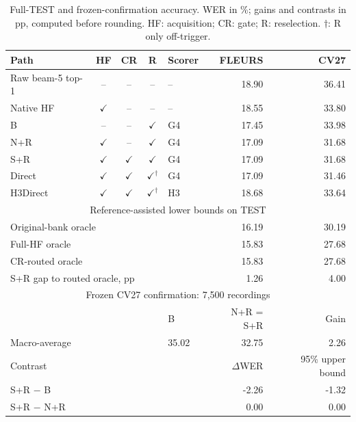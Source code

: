 \begin{table}[t]\centering\footnotesize
\caption{Full-TEST and frozen-confirmation accuracy. WER in \%; gains and contrasts in pp, computed before rounding. HF: acquisition; CR: gate; R: reselection. $\dagger$: R only off-trigger.}\label{tab:paths}
\setlength{\tabcolsep}{3pt}\renewcommand{\arraystretch}{1.03}
\begin{tabular}{@{}lccclrr@{}}\toprule
Path & HF & CR & R & Scorer & FLEURS & CV27\\\midrule
Raw beam-5 top-1 & -- & -- & -- & -- & 18.90 & 36.41\\
Native HF & $\checkmark$ & -- & -- & -- & 18.55 & 33.80\\
B & -- & -- & $\checkmark$ & G4 & 17.45 & 33.98\\
N+R & $\checkmark$ & -- & $\checkmark$ & G4 & 17.09 & 31.68\\
S+R & $\checkmark$ & $\checkmark$ & $\checkmark$ & G4 & 17.09 & 31.68\\
Direct & $\checkmark$ & $\checkmark$ & $\checkmark^{\dagger}$ & G4 & 17.09 & 31.46\\
H3Direct & $\checkmark$ & $\checkmark$ & $\checkmark^{\dagger}$ & H3 & 18.68 & 33.64\\
\midrule\multicolumn{7}{c}{Reference-assisted lower bounds on TEST}\\
\multicolumn{5}{l}{Original-bank oracle} & 16.19 & 30.19\\
\multicolumn{5}{l}{Full-HF oracle} & 15.83 & 27.68\\
\multicolumn{5}{l}{CR-routed oracle} & 15.83 & 27.68\\
\multicolumn{5}{l}{S+R gap to routed oracle, pp} & 1.26 & 4.00\\
\midrule\multicolumn{7}{c}{Frozen CV27 confirmation: 7,500 recordings}\\
\multicolumn{4}{l}{} & B & N+R = S+R & Gain\\\midrule
\multicolumn{4}{l}{Macro-average} & 35.02 & 32.75 & 2.26\\
\midrule\multicolumn{5}{l}{Contrast} & $\Delta$WER & 95\% upper bound\\
\multicolumn{5}{l}{S+R $-$ B} & -2.26 & -1.32\\
\multicolumn{5}{l}{S+R $-$ N+R} & 0.00 & 0.00\\
\bottomrule\end{tabular}\end{table}
